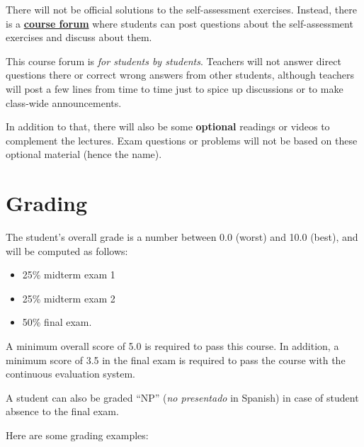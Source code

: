 \documentclass[11pt, a4paper, twoside]{article}
\begin{document}
There will not be official solutions to the self-assessment exercises. Instead,
there is a \textbf{\href{http://it.uc3m.es}{course forum}} where students can
post questions about the self-assessment exercises and discuss about them.

This course forum is \emph{for students by students}. Teachers will not answer
direct questions there or correct wrong answers from other students, although
teachers will post a few lines from time to time just to spice up discussions
or to make class-wide announcements.

In addition to that, there will also be some \textbf{optional} readings or
videos to complement the lectures. Exam questions or problems will not be based on these optional material (hence the name).

\section{Grading}

The student's overall grade is a number between 0.0 (worst) and 10.0 (best),
and will be computed as follows:

\begin{itemize}

  \item 25\% midterm exam 1

  \item 25\% midterm exam 2

  \item 50\% final exam.

\end{itemize}

A minimum overall score of 5.0 is required to pass this course. In addition,
a minimum score of 3.5 in the final exam is required to pass
the course with the continuous evaluation system.

A student can also be graded ``NP'' (\emph{no presentado} in Spanish) in case
of student absence to the final exam.

Here are some grading examples:
\end{document}
